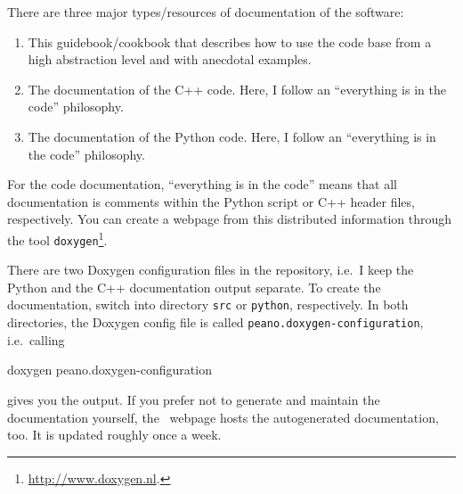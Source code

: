 There are three major types/resources of documentation of the software:
\begin{enumerate}
  \item This guidebook/cookbook that describes how to use the code base from a
  high abstraction level and with anecdotal examples.
  \item The documentation of the C++ code. Here, I follow an ``everything is in
  the code'' philosophy.
  \item The documentation of the Python code. Here, I follow an ``everything is
  in the code'' philosophy.
\end{enumerate}

\noindent
For the code documentation, ``everything is in the code'' means that all
documentation is comments within the Python script or C++ header files,
respectively.
You can create a webpage from this distributed information through
the tool \texttt{doxygen}\footnote{\url{http://www.doxygen.nl}.}. 


There are two Doxygen configuration files in the repository, i.e.~I keep the
Python and the C++ documentation output separate.
To create the documentation, switch into directory \texttt{src} or
\texttt{python}, respectively. 
In both directories, the Doxygen config file is called
\texttt{peano.doxygen-configuration}, i.e.~calling

\begin{code}
doxygen peano.doxygen-configuration
\end{code}

\noindent
gives you the output. If you prefer not to generate and maintain the
documentation yourself, the \Peano\ webpage hosts the autogenerated
documentation, too.
It is updated roughly once a week.

